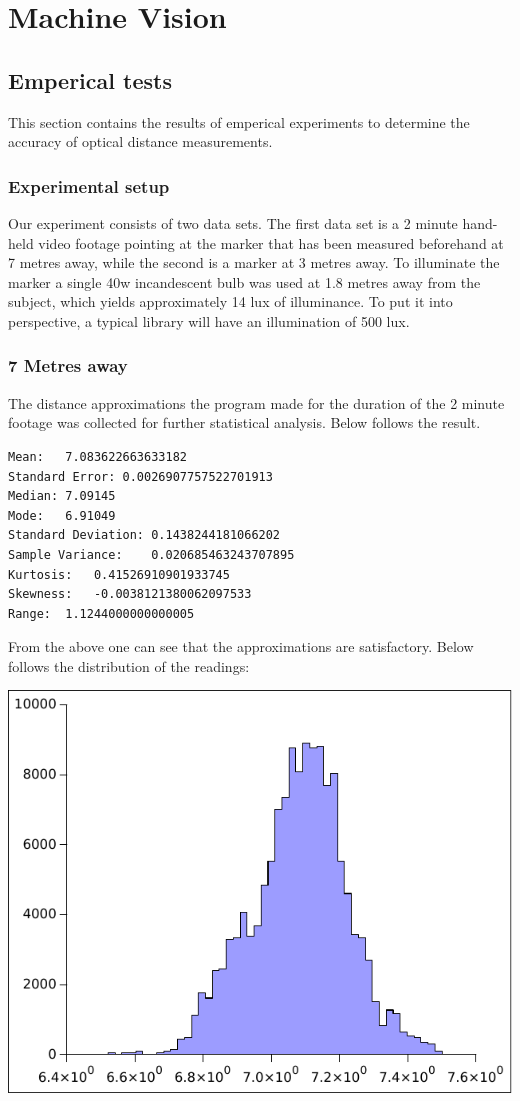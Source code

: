 \section{Machine Vision}
\subsection{Emperical tests}
This section contains the results of emperical experiments to determine the accuracy of optical distance measurements.
\subsubsection{Experimental setup}
Our experiment consists of two data sets. The first data set is a 2 minute hand-held video footage pointing at the marker that has been measured beforehand at 7 metres away, while the second is a marker at 3 metres away. To illuminate the marker a single 40w incandescent bulb was used at 1.8 metres away from the subject, which yields approximately 14 lux of illuminance. To put it into perspective, a typical library will have an illumination of 500 lux.
\subsubsection{7 Metres away}
The distance approximations the program made for the duration of the 2 minute footage was collected for further statistical analysis. Below follows the result.
\begin{verbatim}
Mean:	7.083622663633182
Standard Error:	0.0026907757522701913
Median:	7.09145
Mode:	6.91049
Standard Deviation:	0.1438244181066202
Sample Variance:	0.020685463243707895
Kurtosis:	0.41526910901933745
Skewness:	-0.0038121380062097533
Range:	1.1244000000000005
\end{verbatim}
From the above one can see that the approximations are satisfactory. Below follows the distribution of the readings:\par
\includegraphics[]{machine_vision/data/7metres.pdf}
